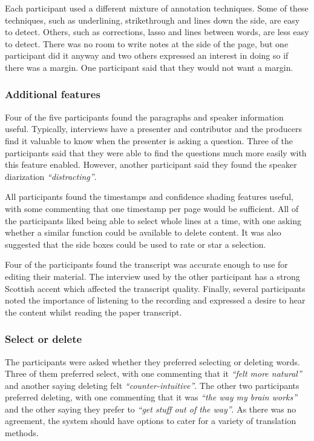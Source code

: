Each participant used a different mixture of annotation techniques. Some of
these techniques, such as underlining, strikethrough and lines down the side,
are easy to detect.  Others, such as corrections, lasso and lines between
words, are less easy to detect. There was no room to write notes at the side of
the page, but one participant did it anyway and two others expressed an interest
in doing so if there was a margin. One participant said that they would
not want a margin.

\subsubsection{Additional features}
Four of the five participants found the paragraphs and speaker information
useful. Typically, interviews have a presenter and contributor and the
producers find it valuable to know when the presenter is asking a question.
Three of the participants said that they were able to find the questions much
more easily with this feature enabled. However, another participant said they
found the speaker diarization \textit{``distracting''}.

All participants found the timestamps and confidence shading features useful,
with some commenting that one timestamp per page would be sufficient.  All of
the participants liked being able to select whole lines at a time, with one
asking whether a similar function could be available to delete content. It was
also suggested that the side boxes could be used to rate or star a selection.

Four of the participants found the transcript was accurate enough to use for
editing their material.  The interview used by the other participant has a
strong Scottish accent which affected the transcript quality. Finally, several
participants noted the importance of listening to the recording and expressed a
desire to hear the content whilst reading the paper transcript.

\subsubsection{Select or delete}
The participants were asked whether
they preferred selecting or deleting words. Three of them preferred select, with
one commenting that it \textit{``felt more natural''} and another saying
deleting felt \textit{``counter-intuitive''}. The other two participants
preferred deleting, with one commenting that it was \textit{``the way my brain
  works''} and the other saying they prefer to \textit{``get stuff out of the
  way''}. As there was no agreement, the system should have options to cater
for a variety of translation methods.

